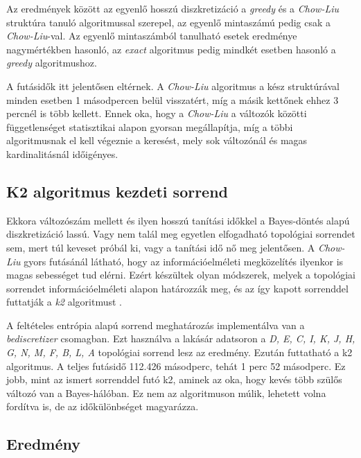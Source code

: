 Az eredmények között az egyenlő hosszú diszkretizáció a \emph{greedy} és a \emph{Chow-Liu} struktúra tanuló algoritmussal szerepel, az egyenlő mintaszámú pedig csak a \emph{Chow-Liu}-val. Az egyenlő mintaszámból tanulható esetek eredménye nagymértékben hasonló, az \emph{exact} algoritmus pedig mindkét esetben hasonló a \emph{greedy} algoritmushoz.

A futásidők itt jelentősen eltérnek. A \emph{Chow-Liu} algoritmus a kész struktúrával minden esetben 1 másodpercen belül visszatért, míg a másik kettőnek ehhez 3 percnél is több kellett. Ennek oka, hogy a \emph{Chow-Liu} a változók közötti függetlenséget statisztikai alapon gyorsan megállapítja, míg a többi algoritmusnak el kell végeznie a keresést, mely sok változónál és magas kardinalitásnál időigényes.

\subsection{K2 algoritmus kezdeti sorrend}
Ekkora változószám mellett és ilyen hosszú tanítási időkkel a Bayes-döntés alapú diszkretizáció lassú. Vagy nem talál meg egyetlen elfogadható topológiai sorrendet sem, mert túl keveset próbál ki, vagy a tanítási idő nő meg jelentősen. A \emph{Chow-Liu} gyors futásánál látható, hogy az információelméleti megközelítés ilyenkor is magas sebességet tud elérni. Ezért készültek olyan módszerek, melyek a topológiai sorrendet információelméleti alapon határozzák meg, és az így kapott sorrenddel futtatják a \emph{k2} algoritmust \cite{aghdam2019some}.

A feltételes entrópia alapú sorrend meghatározás implementálva van a \emph{bediscretizer} csomagban. Ezt használva a lakásár adatsoron a \emph{D, E, C, I, K, J, H, G, N, M, F, B, L, A} topológiai sorrend lesz az eredmény. Ezután futtatható a k2 algoritmus. A teljes futásidő 112.426 másodperc, tehát 1 perc 52 másodperc. Ez jobb, mint az ismert sorrenddel futó k2, aminek az oka, hogy kevés több szülős változó van a Bayes-hálóban. Ez nem az algoritmuson múlik, lehetett volna fordítva is, de az időkülönbséget magyarázza.

\subsection{Eredmény}


